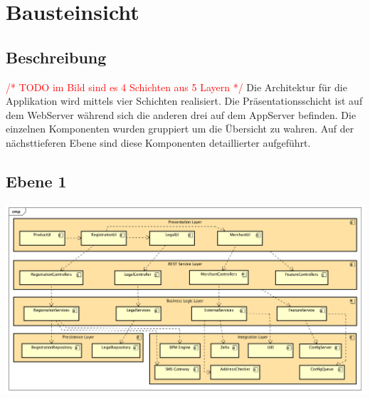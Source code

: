\graphicspath{{./images/}}

\chapter{Bausteinsicht}

\section{Beschreibung}
\textcolor{red}{ /* TODO im Bild sind es 4 Schichten aus 5 Layern */}
Die Architektur für die Applikation wird mittels vier Schichten realisiert. Die Präsentationsschicht ist auf dem WebServer während sich die anderen drei auf dem AppServer befinden. Die einzelnen Komponenten wurden gruppiert um die Übersicht zu wahren. Auf der nächsttieferen Ebene sind diese Komponenten detaillierter aufgeführt.

\begin{landscape}
\section{Ebene 1}

\begin{center}
	\includegraphics[scale=0.6]{ComponentLevel1.png}
\end{center}

\end{landscape}
\restoregeometry

